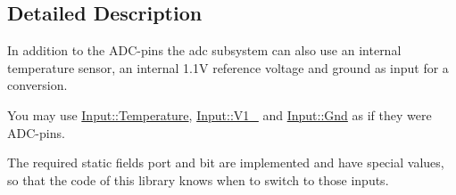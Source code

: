 \subsection{Detailed Description}
In addition to the A\+D\+C-\/pins the adc subsystem can also use an internal temperature sensor, an internal 1.\+1V reference voltage and ground as input for a conversion. 

You may use \hyperlink{structadc_1_1Input_1_1Temperature}{Input\+::\+Temperature}, \hyperlink{structadc_1_1Input_1_1V1__1}{Input\+::\+V1\+\_} and \hyperlink{structadc_1_1Input_1_1Gnd}{Input\+::\+Gnd} as if they were A\+D\+C-\/pins.

The required static fields port and bit are implemented and have special values, so that the code of this library knows when to switch to those inputs. 
